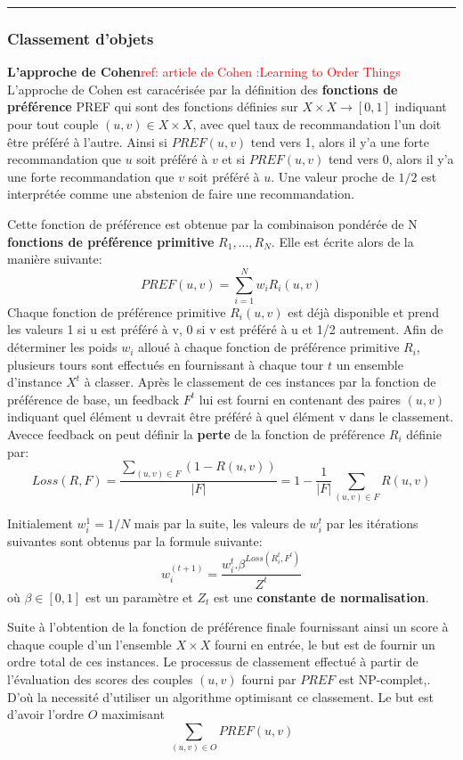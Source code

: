 \documentclass[a4paper,12pt,openany,oneside]{article}
\begin{document}
   \noindent \rule{\textwidth}{1pt} 
  
  
  \subsubsection{Classement d'objets}
 \textbf{L'approche de Cohen}\textcolor{red}{ref: article de Cohen :Learning to Order Things} \\
 L'approche de Cohen est caracérisée par la définition des \textbf{fonctions de préférence} PREF qui sont des fonctions définies sur $X\times X\rightarrow [0,1]$ indiquant pour tout couple $(u,v)\in X\times X$, avec quel taux de recommandation l'un doit être préféré à l'autre. Ainsi si $PREF(u,v)$ tend vers 1, alors il y'a une forte recommandation que $u$ soit préféré à $v$ et si $PREF(u,v)$ tend vers 0, alors il y'a une forte recommandation que $v$ soit préféré à $u$. Une valeur proche de $1/2$ est interprétée comme une abstenion de faire une recommandation.

Cette fonction de préférence est obtenue par la combinaison pondérée de N \textbf{fonctions de préférence primitive} $R_1,...,R_N$. Elle est écrite alors de la manière suivante:
\[
	PREF(u,v)=\sum_{i=1}^{N}w_iR_i(u,v)
\]
 Chaque fonction de préférence primitive $R_i(u,v)$ est déjà disponible et prend les valeurs 1 si u est préféré à v, 0 si v est préféré à u et 1/2 autrement.
 Afin de déterminer les poids $w_i$ alloué à chaque fonction de préférence primitive $R_i$, plusieurs tours sont effectués en fournissant à chaque tour $t$ un ensemble d'instance $X^t$ à classer. Après le classement de ces instances par la fonction de préférence de base, un feedback $F^t$ lui est fourni en contenant des paires $(u,v)$ indiquant quel élément u devrait être préféré à quel élément v dans le classement. Avecce feedback on peut définir la \textbf{perte} de la fonction de préférence $R_i$ définie par:
 \[
 	Loss(R,F)=\frac{\sum_{(u,v)\in F}(1-R(u,v))}{|F|}=1-\frac{1}{|F|}\sum_{(u,v)\in F} R(u,v)
 \]
 
 Initialement $w_i^1=1/N$ mais par la suite, les valeurs de $w_i^t$ par les itérations suivantes sont obtenus par la formule suivante:
 \[
 	w_i^(t+1)=\frac{w_i^t.\beta^{Loss(R_i^t, F^t)}}{Z^t}
 \]
 où $\beta \in [0,1]$ est un paramètre et $Z_t$ est une \textbf{constante de normalisation}.
 
Suite à l'obtention de la fonction de préférence finale fournissant ainsi un score à chaque couple d'un l'ensemble $X\times X$ fourni en entrée, le but est de fournir un ordre total de ces instances. Le processus de classement effectué à partir de l'évaluation des scores des couples $(u,v)$ fourni par $PREF$ est NP-complet,. D'où la necessité d'utiliser un algorithme optimisant ce classement.
Le but est d'avoir l'ordre $O$ maximisant
\[
	\sum_{(u,v)\in O}PREF(u,v)
\]
\end{document}
